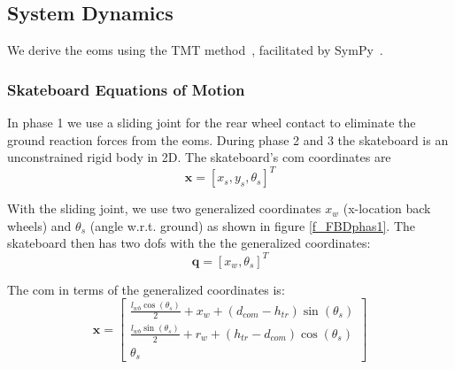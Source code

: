 \documentclass[default,iicol]{sn-jnl}
\begin{document}
\subsection{System Dynamics}\label{s_systemdynamics}

We derive the \glspl{eom} using
the TMT method~\cite{vallery_heike_advanced_2018}, facilitated by SymPy~\cite{meurer_sympy_2017}.

\subsubsection{Skateboard Equations of Motion}
In phase 1 we use a sliding joint for the rear wheel contact to eliminate the ground reaction forces from the \glspl{eom}. During phase 2 and 3 the skateboard is an unconstrained rigid body in 2D. 
The skateboard's \gls{com} coordinates are
%
\begin{equation}
    \mathbf{x} = [x_s, y_s, \theta_s]^T
\end{equation}

With the sliding joint, we use two generalized coordinates $x_w$ (x-location
back wheels) and $\theta_s$ (angle w.r.t. ground) as shown in figure
\ref{f_FBDphas1}.
The skateboard then has two \glspl{dof} with the the generalized coordinates:
%
\begin{equation}
    \mathbf{q} = [x_w, \theta_s]^T
\end{equation}

The \gls{com} in terms of the generalized coordinates is:
%
\begin{equation}
\mathbf{x}=\left[\begin{array}{c}
\frac{l_{w b} \cos \left(\theta_s\right)}{2}+x_w+\left(d_{c o m}-h_{t r}\right) \sin \left(\theta_s\right) \\
\frac{l_{w b} \sin \left(\theta_s\right)}{2}+r_w+\left(h_{t r}-d_{c o m}\right) \cos \left(\theta_s\right) \\
\theta_s
\end{array}\right]
\end{equation}
\end{document}
